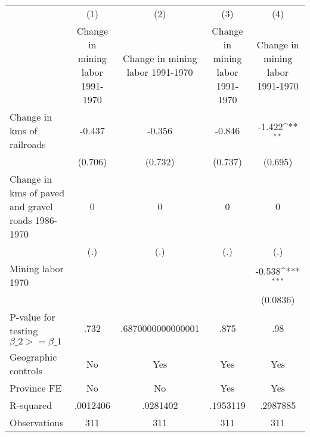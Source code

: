{
\def\sym#1{\ifmmode^{#1}\else\(^{#1}\)\fi}
\begin{tabular}{l*{4}{c}}
\hline\hline
                &\multicolumn{1}{c}{(1)}&\multicolumn{1}{c}{(2)}&\multicolumn{1}{c}{(3)}&\multicolumn{1}{c}{(4)}\\
                &\multicolumn{1}{c}{Change in mining labor 1991-1970}&\multicolumn{1}{c}{Change in mining labor 1991-1970}&\multicolumn{1}{c}{Change in mining labor 1991-1970}&\multicolumn{1}{c}{Change in mining labor 1991-1970}\\
\hline
Change in kms of railroads&   -0.437         &   -0.356         &   -0.846         &   -1.422\sym{**} \\
                &  (0.706)         &  (0.732)         &  (0.737)         &  (0.695)         \\
[1em]
Change in kms of paved and gravel roads 1986-1970&        0         &        0         &        0         &        0         \\
                &      (.)         &      (.)         &      (.)         &      (.)         \\
[1em]
Mining labor 1970&                  &                  &                  &   -0.538\sym{***}\\
                &                  &                  &                  & (0.0836)         \\
\hline
P-value for testing $\beta\_{2} >= \beta\_{1}$&     .732         &.6870000000000001         &     .875         &      .98         \\
Geographic controls&       No         &      Yes         &      Yes         &      Yes         \\
Province FE     &       No         &       No         &      Yes         &      Yes         \\
R-squared       & .0012406         & .0281402         & .1953119         & .2987885         \\
Observations    &      311         &      311         &      311         &      311         \\
\hline\hline
\end{tabular}
}
